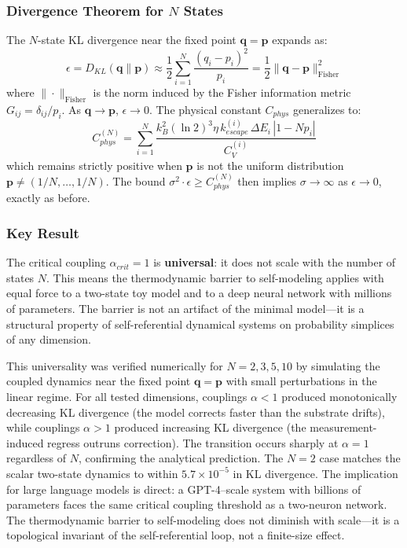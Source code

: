 \documentclass[12pt]{article}
\begin{document}
\subsubsection{Divergence Theorem for $N$ States}
The $N$-state KL divergence near the fixed point $\mathbf{q} = \mathbf{p}$ expands as:
\begin{equation}
    \epsilon = D_{KL}(\mathbf{q}\|\mathbf{p}) \approx \frac{1}{2} \sum_{i=1}^{N} \frac{(q_i - p_i)^2}{p_i} = \frac{1}{2} \|\mathbf{q} - \mathbf{p}\|^2_{\text{Fisher}}
\end{equation}
where $\|\cdot\|_{\text{Fisher}}$ is the norm induced by the Fisher information metric $G_{ij} = \delta_{ij}/p_i$. As $\mathbf{q} \to \mathbf{p}$, $\epsilon \to 0$. The physical constant $C_{phys}$ generalizes to:
\begin{equation}
    C_{phys}^{(N)} = \sum_{i=1}^{N} \frac{k_B^2 (\ln 2)^3 \eta\, k_{escape}^{(i)}\, \Delta E_i\, |1 - Np_i|}{C_V^{(i)}}
\end{equation}
which remains strictly positive when $\mathbf{p}$ is not the uniform distribution $\mathbf{p} \neq (1/N, \ldots, 1/N)$. The bound $\sigma^2 \cdot \epsilon \ge C_{phys}^{(N)}$ then implies $\sigma \to \infty$ as $\epsilon \to 0$, exactly as before.

\subsubsection{Key Result}
The critical coupling $\alpha_{crit} = 1$ is \textbf{universal}: it does not scale with the number of states $N$. This means the thermodynamic barrier to self-modeling applies with equal force to a two-state toy model and to a deep neural network with millions of parameters. The barrier is not an artifact of the minimal model---it is a structural property of self-referential dynamical systems on probability simplices of any dimension.

This universality was verified numerically for $N = 2, 3, 5, 10$ by simulating the coupled dynamics near the fixed point $\mathbf{q} = \mathbf{p}$ with small perturbations in the linear regime. For all tested dimensions, couplings $\alpha < 1$ produced monotonically decreasing KL divergence (the model corrects faster than the substrate drifts), while couplings $\alpha > 1$ produced increasing KL divergence (the measurement-induced regress outruns correction). The transition occurs sharply at $\alpha = 1$ regardless of $N$, confirming the analytical prediction. The $N = 2$ case matches the scalar two-state dynamics to within $5.7 \times 10^{-5}$ in KL divergence. The implication for large language models is direct: a GPT-4--scale system with billions of parameters faces the same critical coupling threshold as a two-neuron network. The thermodynamic barrier to self-modeling does not diminish with scale---it is a topological invariant of the self-referential loop, not a finite-size effect.
\end{document}
